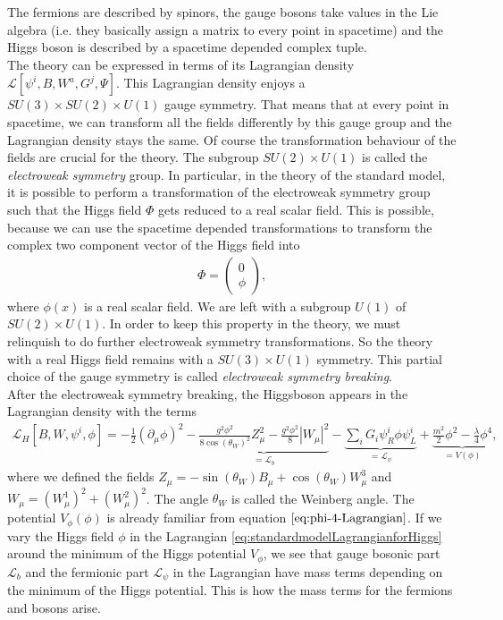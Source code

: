 \documentclass{article}
\numberwithin{equation}{section}
\begin{document}
The fermions are described by spinors, the gauge bosons take values in the Lie algebra (i.e. they basically assign a matrix to every point in spacetime) and the Higgs boson is described by a spacetime depended complex  tuple. \\
The theory can be expressed in terms of its Lagrangian density $\mathcal{L}[\psi^{i}, B, W^{a}, G^{j}, \Psi]$. This Lagrangian density enjoys a $SU(3) \times SU(2) \times U(1)$ gauge symmetry. 
That means that at every point in spacetime, we can transform  all the fields differently by this gauge group and the Lagrangian density stays the same. Of course the transformation behaviour of the fields are crucial for the theory. The subgroup $SU(2)\times U(1)$ is called the \textit{electroweak symmetry} group. In particular, in the theory of the standard model, it is possible to perform a transformation of the electroweak symmetry group such that the Higgs field $\Phi$ gets reduced to a real scalar field. This is possible, because we can use the spacetime depended transformations to transform the complex two component vector of the Higgs field into 
\begin{align*}
    \Phi = \begin{pmatrix} 0 \\ \phi\end{pmatrix}, 
\end{align*}
where $\phi(x)$ is a real scalar field. We are left with a subgroup $U(1)$ of $SU(2) \times U(1)$. 
In order to keep this property in the theory, we must relinquish to do further electroweak symmetry transformations. So the theory with a real Higgs field remains with a $SU(3) \times U(1)$ symmetry. This partial choice of the gauge symmetry is called \textit{electroweak symmetry breaking}. \\
After the electroweak symmetry breaking, the Higgsboson appears in the Lagrangian density with the terms%
\begin{align}
    \mathcal{L}_H[B, W, \psi^{i}, \phi] = -\frac{1}{2}(\partial_{\mu} \phi)^2 -\underbrace{\frac{g^2\phi^2}{8 \cos(\theta_{W})^2} Z_{\mu}^2-\frac{g^2 \phi^2}{8}|W_{\mu}|^2 }_{=\mathcal{L}_b } - \underbrace{\sum_{i}G_i\psi^{i}_R \phi \psi^{i}_L}_{=\mathcal{L}_{\psi}}+\underbrace{\frac{m^2}{2}\phi^2-\frac{\lambda}{4}\phi^4}_{ = V(\phi)} ,
    \label{eq:standardmodelLagrangianforHiggs}
\end{align}
where we defined the fields $Z_{\mu}  = -\sin(\theta_W)B_{\mu} + \cos(\theta_W)W^{3}_{\mu}$ and $W_{\mu} = (W^1_{\mu})^2 + (W^2_{\mu})^2$. The angle $\theta_W$ is called the Weinberg angle. The potential $V_{\phi}(\phi)$ is already familiar from equation $\eqref{eq:phi-4-Lagrangian}$. If we vary the Higgs field $\phi$ in the Lagrangian \eqref{eq:standardmodelLagrangianforHiggs} around the minimum of the Higgs potential $V_{\phi}$, we see that gauge bosonic part $\mathcal{L}_{b}$ and the fermionic part $\mathcal{L}_{\psi}$ in the Lagrangian have mass terms depending on the minimum of the Higgs potential. This is how the mass terms for the fermions and bosons arise. \\
\end{document}
